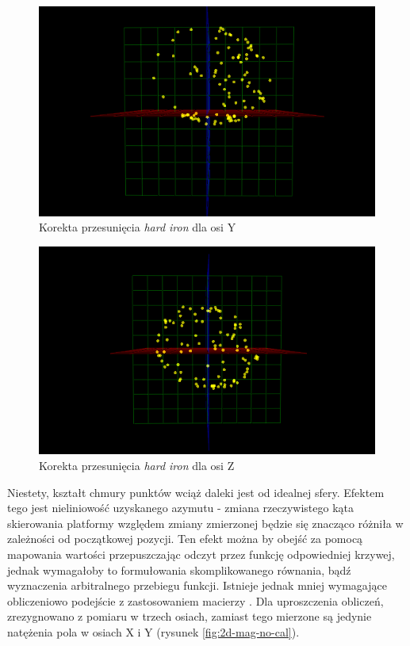 \begin{figure}[H]
	\centering
		\includegraphics[width=0.6\linewidth]{rys/ScanBot-05-magnetometer-3d-calibration.PNG}
	\caption{Korekta przesunięcia \emph{hard iron} dla osi Y}
	\label{fig:3d-mag-hard-corr-y}
\end{figure}

\begin{figure}[H]
	\centering
		\includegraphics[width=0.6\linewidth]{rys/ScanBot-06-magnetometer-3d-calibration.PNG}
	\caption{Korekta przesunięcia \emph{hard iron} dla osi Z}
	\label{fig:3d-mag-hard-corr-z}
\end{figure}

Niestety, kształt chmury punktów wciąż daleki jest od idealnej sfery. Efektem tego jest nieliniowość uzyskanego azymutu - zmiana rzeczywistego kąta skierowania platformy względem zmiany zmierzonej będzie się znacząco różniła w zależności od początkowej pozycji. Ten efekt można by obejść za pomocą mapowania wartości przepuszczając odczyt przez funkcję odpowiedniej krzywej, jednak wymagałoby to formułowania skomplikowanego równania, bądź wyznaczenia arbitralnego przebiegu funkcji. Istnieje jednak mniej wymagające obliczeniowo podejście z zastosowaniem macierzy \cite{hard-soft-iron}. Dla uproszczenia obliczeń, zrezygnowano z pomiaru w trzech osiach, zamiast tego mierzone są jedynie natężenia pola w osiach X i Y (rysunek \ref{fig:2d-mag-no-cal}).

